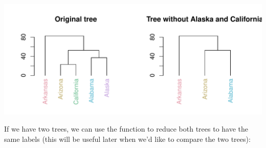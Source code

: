 \documentclass[shortnames,nojss,article]{jss}\usepackage[]{graphicx}\usepackage[]{color}
\makeatletter
\def\maxwidth{ %
  \ifdim\Gin@nat@width>\linewidth
    \linewidth
  \else
    \Gin@nat@width
  \fi
}
\newenvironment{knitrout}{}{} %
\makeatother
\begin{document}
\begin{knitrout}
{\centering \includegraphics[width=\maxwidth]{figure/unnamed-chunk-28} 

}



\end{knitrout}


If we have two trees, we can use the  function to reduce both trees to have the same labels (this will be useful later when we'd like to compare the two trees):
\end{document}
